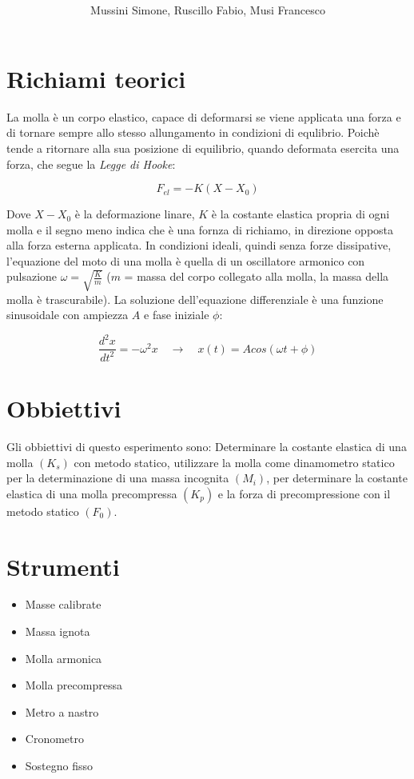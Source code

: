\documentclass[12pt, a4paper]{article}
\title{\textbf{\scalebox{1.4}{\text{{\Huge Pendolo}}}}}
\date{}
\author{\begin{small}Mussini Simone, Ruscillo Fabio, Musi Francesco\end{small}}
\begin{document}
\maketitle



\section{Richiami teorici}
La molla è un corpo elastico, capace di deformarsi se viene applicata una forza e di tornare sempre allo stesso allungamento in condizioni di equlibrio. Poichè tende a ritornare alla sua posizione di equilibrio, quando deformata esercita una forza, che segue la \textit{Legge di Hooke}: 

\begin{equation}
    F_{el} = -K(X-X_0)
\end{equation}

Dove $X-X_0$ è la deformazione linare, $K$ è la costante elastica propria di ogni molla e il segno meno indica che è una fornza di richiamo, in direzione opposta alla forza esterna applicata.
In condizioni ideali, quindi senza forze dissipative, l'equazione del moto di una molla è quella di un oscillatore armonico con pulsazione $\omega = \sqrt{\frac{K}{m}}$ ($m$ = massa del corpo collegato alla molla, la massa della molla è trascurabile). La soluzione dell'equazione differenziale è una funzione sinusoidale con ampiezza $A$ e fase iniziale $\phi$:

\begin{equation}
    \frac{d^2x}{dt^2} = -\omega^2x  \quad \xrightarrow{} \quad   x(t) = A cos(\omega t + \phi)
\end{equation}



\section{Obbiettivi}
Gli obbiettivi di questo esperimento sono: 
Determinare la costante elastica di una molla $(K_s)$ con metodo statico,  utilizzare la molla come dinamometro statico per la determinazione di una massa incognita $(M_i)$, per determinare la costante elastica di una molla precompressa $(K_p)$ e la forza di precompressione con il metodo statico $(F_0)$.


\section{Strumenti}
    \begin{itemize}
        \item Masse calibrate
        \item Massa ignota 
        \item Molla armonica   
        \item Molla precompressa 
        \item Metro a nastro 
        \item Cronometro 
        \item Sostegno fisso 
    \end{itemize}
\end{document}
